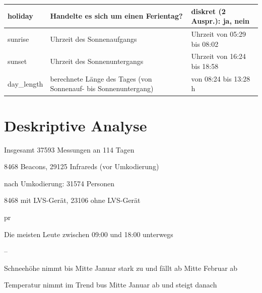 \documentclass[12pt]{scrreprt}
\begin{document}
\begin{table}
\begin{adjustbox}{max width=\textwidth}
\begin{tabular}{l|l|l}
				\hline
				
				holiday & Handelte es sich um einen Ferientag? & diskret (2 Auspr.): ja, nein \\
				
				\hline
				
				sunrise & Uhrzeit des Sonnenaufgangs & Uhrzeit von 05:29 bis 08:02 \\
				
				\hline
				
				sunset & Uhrzeit des Sonnenuntergangs & Uhrzeit von 16:24 bis 18:58 \\
				
				\hline
				
				day\_length & berechnete Länge des Tages (von Sonnenauf- bis Sonnenuntergang) & von 08:24 bis 13:28 h \\
				
				\hline
				
			\end{tabular}
			
		\end{adjustbox}
		
		\label{tab:var}
		
	\end{table}
	
	
	
	\chapter{Deskriptive Analyse}
	
	Insgesamt 37593 Messungen an 114 Tagen
	
	
	
	8468 Beacons, 29125 Infrareds (vor Umkodierung)
	
	
	
	nach Umkodierung: 31574 Personen
	
	
	
	8468 mit LVS-Gerät, 23106 ohne LVS-Gerät
	
	pr
	
	Die meisten Leute zwischen 09:00 und 18:00 unterwegs
	
	
	
	--
	
	
	
	Schneehöhe nimmt bis Mitte Januar stark zu und fällt ab Mitte Februar ab
	
	
	
	Temperatur nimmt im Trend bus Mitte Januar ab und steigt danach
	
\end{document}

